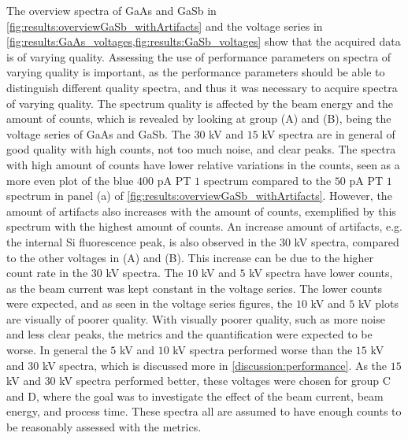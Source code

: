 The overview spectra of GaAs and GaSb in \cref{fig:results:overviewGaSb_withArtifacts} and the voltage series in \cref{fig:results:GaAs_voltages,fig:results:GaSb_voltages} show that the acquired data is of varying quality.
Assessing the use of performance parameters on spectra of varying quality is important, as the performance parameters should be able to distinguish different quality spectra, and thus it was necessary to acquire spectra of varying quality.
The spectrum quality is affected by the beam energy and the amount of counts, which is revealed by looking at group (A) and (B), being the voltage series of GaAs and GaSb.
The $30$ kV and $15$ kV spectra are in general of good quality with high counts, not too much noise, and clear peaks.
The spectra with high amount of counts have lower relative variations in the counts, seen as a more even plot of the blue $400$ pA PT $1$ spectrum compared to the $50$ pA PT $1$ spectrum in panel (a) of \cref{fig:results:overviewGaSb_withArtifacts}.
However, the amount of artifacts also increases with the amount of counts, exemplified by this spectrum with the highest amount of counts.
An increase amount of artifacts, e.g. the internal Si fluorescence peak, is also observed in the $30$ kV spectra, compared to the other voltages in (A) and (B). 
This increase can be due to the higher count rate in the $30$ kV spectra.
The $10$ kV and $5$ kV spectra have lower counts, as the beam current was kept constant in the voltage series.
The lower counts were expected, and as seen in the voltage series figures, the $10$ kV and $5$ kV plots are visually of poorer quality.
With visually poorer quality, such as more noise and less clear peaks, the metrics and the quantification were expected to be worse.
In general the $5$ kV and $10$ kV spectra performed worse than the $15$ kV and $30$ kV spectra, which is discussed more in \cref{discussion:performance}.
As the $15$ kV and $30$ kV spectra performed better, these voltages were chosen for group C and D, where the goal was to investigate the effect of the beam current, beam energy, and process time.
These spectra all are assumed to have enough counts to be reasonably assessed with the metrics.


